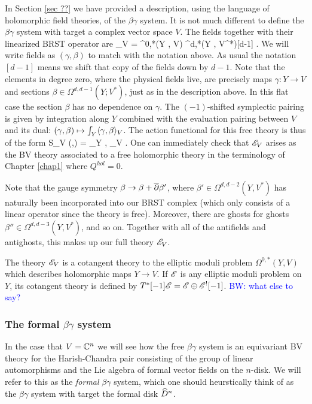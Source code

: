 \documentclass[10pt]{amsart}
\def\brian{\textcolor{blue}{BW: }\textcolor{blue}}
\begin{document}
In Section \ref{sec ??} we have provided a description, using the language of holomorphic field theories, of the $\beta\gamma$ system.
It is not much different to define the $\beta\gamma$ system with target a complex vector space $V$. 
The fields together with their linearized BRST operator are
\ben
\sE_V = \Omega^{0,*}(Y , V) \oplus \Omega^{d,*}(Y , V^*)[d-1] .
\een
We will write fields as $(\gamma,\beta)$ to match with the notation above.
As usual the notation $[d-1]$ means we shift that copy of the fields down by $d-1$. 
Note that the elements in degree zero, where the physical fields live, are precisely maps $\gamma : Y \to V$ and sections $\beta \in\Omega^{d,d-1} (Y ; V^*)$, just as in the description above. 
In this flat case the section $\beta$ has no dependence on $\gamma$.
The $(-1)$-shifted symplectic pairing is given by integration along $Y$ combined with the evaluation pairing between $V$ and its dual: $(\gamma, \beta) \mapsto \int_Y \langle\gamma, \beta\rangle_V$. 
The action functional for this free theory is thus of the form
\ben
S_V (\beta,\gamma) = \int_Y \<\beta, \dbar \gamma\>_{V} .
\een
One can immediately check that $\mathscr E_V$ arises as the BV theory associated to a free holomorphic theory in the terminology of Chapter \ref{chap1} where $Q^{hol} = 0$. 

Note that the gauge symmetry $\beta \to \beta + \overline{\partial} \beta'$, where $\beta' \in \Omega^{d,d-2} (Y, V^*)$ has naturally been incorporated into our BRST complex (which only consists of a linear operator since the theory is free). 
Moreover, there are ghosts for ghosts $\beta'' \in \Omega^{d,d-3}(Y , V^*)$, and so on.
Together with all of the antifields and antighosts, this makes up our full theory $\mathscr E_V$. 

The theory $\mathscr E_V$ is a cotangent theory to the elliptic moduli problem $\Omega^{0,*}(Y, V)$ which describes holomorphic maps $Y \to V$.
If $\mathscr E$ is any elliptic moduli problem on $Y$, its cotangent theory is defined by $T^*[-1] \mathscr E = \mathscr E \oplus \mathscr E^![-1]$. 
\brian{what else to say?}

\subsubsection{The formal $\beta\gamma$ system}

In the case that $V = \mathbb C^n$ we will see how the free $\beta\gamma$ system is an equivariant BV theory for the Harish-Chandra pair consisting of the group of linear automorphisms and the Lie algebra of formal vector fields on the $n$-disk.
We will refer to this as the {\em formal} $\beta\gamma$ system, which one should heurstically think of as the $\beta\gamma$ system with target the formal disk $\widehat{D}^n$.
\end{document}
